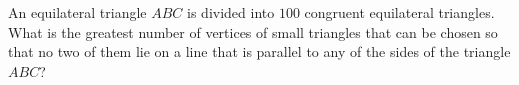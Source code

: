 An equilateral triangle $ABC$ is divided into $100$ congruent equilateral triangles. What is the greatest number of vertices of small triangles that can be chosen so that no two of them lie on a line that is parallel to any of the sides of the triangle $ABC$?